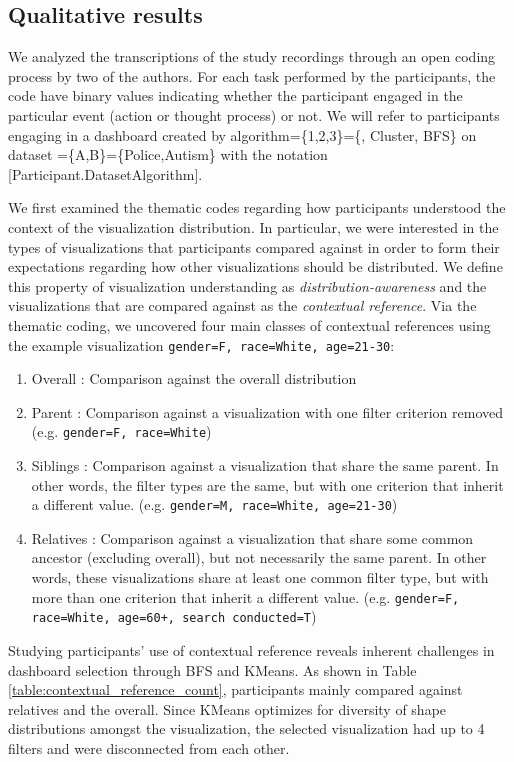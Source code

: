 \subsection{Qualitative results}
We analyzed the transcriptions of the study recordings through an open coding process by two of the authors. For each task performed by the participants, the code have binary values indicating whether the participant engaged in the particular event (action or thought process) or not. We will refer to participants engaging in a dashboard created by algorithm=\{1,2,3\}=\{\system, Cluster, BFS\} on dataset =\{A,B\}=\{Police,Autism\} with the notation [Participant.DatasetAlgorithm].

\npar We first examined the thematic codes regarding how participants understood the context of the visualization distribution. In particular, we were interested in the types of visualizations that participants compared against in order to form their expectations regarding how other visualizations should be distributed. We define this property of visualization understanding as \textit{distribution-awareness} and the visualizations that are compared against as the \textit{contextual reference}. Via the thematic coding, we uncovered four main classes of contextual references using the example visualization \texttt{gender=F, race=White, age=21-30}:
\begin{enumerate}
	\item Overall : Comparison against the overall distribution
	\item Parent : Comparison against a visualization with one filter criterion removed (e.g. \texttt{gender=F, race=White})
	\item Siblings : Comparison against a visualization that share the same parent. In other words, the filter types are the same, but with one criterion that inherit a different value. (e.g. \texttt{gender=M, race=White, age=21-30})
	\item Relatives : Comparison against a visualization that share some common ancestor (excluding overall), but not necessarily the same parent. In other words, these visualizations share at least one common filter type, but with more than one criterion that inherit a different value. (e.g. \texttt{gender=F, race=White, age=60+, search conducted=T})
\end{enumerate}
Studying participants' use of contextual reference reveals inherent challenges in dashboard selection through BFS and KMeans. As shown in Table \ref{table:contextual_reference_count}, participants mainly compared against relatives and the overall. Since KMeans optimizes for diversity of shape distributions amongst the visualization, the selected visualization had up to 4 filters and were disconnected from each other.%
